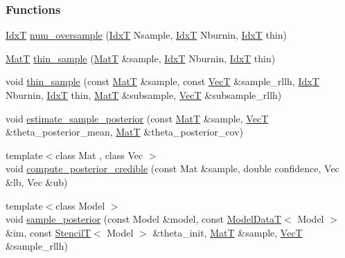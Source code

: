 \subsubsection*{Functions}
\begin{DoxyCompactItemize}
\item 
\hyperlink{namespacemappel_ab17ec0f30b61ece292439d7ece81d3a8}{IdxT} \hyperlink{namespacemappel_1_1mcmc_a29219ed7564edad6489889dc2ec2a0d6}{num\+\_\+oversample} (\hyperlink{namespacemappel_ab17ec0f30b61ece292439d7ece81d3a8}{IdxT} Nsample, \hyperlink{namespacemappel_ab17ec0f30b61ece292439d7ece81d3a8}{IdxT} Nburnin, \hyperlink{namespacemappel_ab17ec0f30b61ece292439d7ece81d3a8}{IdxT} thin)
\item 
\hyperlink{namespacemappel_a7091ab87c528041f7e2027195fad8915}{MatT} \hyperlink{namespacemappel_1_1mcmc_a2930a61f34237af553702ddaaf72c5b5}{thin\+\_\+sample} (\hyperlink{namespacemappel_a7091ab87c528041f7e2027195fad8915}{MatT} \&sample, \hyperlink{namespacemappel_ab17ec0f30b61ece292439d7ece81d3a8}{IdxT} Nburnin, \hyperlink{namespacemappel_ab17ec0f30b61ece292439d7ece81d3a8}{IdxT} thin)
\item 
void \hyperlink{namespacemappel_1_1mcmc_a9e20794d8718ad2230529af28855e542}{thin\+\_\+sample} (const \hyperlink{namespacemappel_a7091ab87c528041f7e2027195fad8915}{MatT} \&sample, const \hyperlink{namespacemappel_a2225ad69f358daa3f4f99282a35b9a3a}{VecT} \&sample\+\_\+rllh, \hyperlink{namespacemappel_ab17ec0f30b61ece292439d7ece81d3a8}{IdxT} Nburnin, \hyperlink{namespacemappel_ab17ec0f30b61ece292439d7ece81d3a8}{IdxT} thin, \hyperlink{namespacemappel_a7091ab87c528041f7e2027195fad8915}{MatT} \&subsample, \hyperlink{namespacemappel_a2225ad69f358daa3f4f99282a35b9a3a}{VecT} \&subsample\+\_\+rllh)
\item 
void \hyperlink{namespacemappel_1_1mcmc_a5bcba6b4606530ab7c6b03e91accc735}{estimate\+\_\+sample\+\_\+posterior} (const \hyperlink{namespacemappel_a7091ab87c528041f7e2027195fad8915}{MatT} \&sample, \hyperlink{namespacemappel_a2225ad69f358daa3f4f99282a35b9a3a}{VecT} \&theta\+\_\+posterior\+\_\+mean, \hyperlink{namespacemappel_a7091ab87c528041f7e2027195fad8915}{MatT} \&theta\+\_\+posterior\+\_\+cov)
\item 
{\footnotesize template$<$class Mat , class Vec $>$ }\\void \hyperlink{namespacemappel_1_1mcmc_af656d2f4b6ea3614f944d4f189da7d88}{compute\+\_\+posterior\+\_\+credible} (const Mat \&sample, double confidence, Vec \&lb, Vec \&ub)
\item 
{\footnotesize template$<$class Model $>$ }\\void \hyperlink{namespacemappel_1_1mcmc_ac2874bf0ff795dd25f90407c851499eb}{sample\+\_\+posterior} (const Model \&model, const \hyperlink{namespacemappel_a97f050df953605381ae9c901c3b125f1}{Model\+DataT}$<$ Model $>$ \&im, const \hyperlink{namespacemappel_a3a06598240007876f8c4bf834ad86197}{StencilT}$<$ Model $>$ \&theta\+\_\+init, \hyperlink{namespacemappel_a7091ab87c528041f7e2027195fad8915}{MatT} \&sample, \hyperlink{namespacemappel_a2225ad69f358daa3f4f99282a35b9a3a}{VecT} \&sample\+\_\+rllh)

\end{DoxyCompactItemize}
